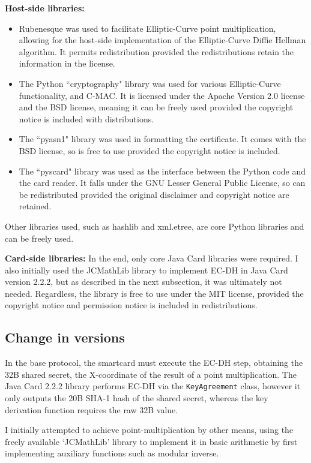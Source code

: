 \documentclass[12pt,a4paper]{article}
\begin{document}
\textbf{Host-side libraries:}
\begin{itemize}
	\item Rubenesque was used to facilitate Elliptic-Curve point multiplication, allowing for the host-side implementation of the Elliptic-Curve Diffie Hellman algorithm. It permits redistribution provided the redistributions retain the information in the license.
	
	\item The Python ``cryptography" library was used for various Elliptic-Curve functionality, and C-MAC. It is licensed under the Apache Version 2.0 license and the BSD license, meaning it can be freely used provided the copyright notice is included with distributions.
	
	\item The ``pyasn1" library was used in formatting the certificate. It comes with the BSD license, so is free to use provided the copyright notice is included.
	
	\item The ``pyscard" library was used as the interface between the Python code and the card reader. It falls under the GNU Lesser General Public License, so can be redistributed provided the original disclaimer and copyright notice are retained.
\end{itemize}
Other libraries used, such as hashlib and xml.etree, are core Python libraries and can be freely used.

\textbf{Card-side libraries:} In the end, only core Java Card libraries were required. I also initially used the JCMathLib library to implement EC-DH in Java Card version 2.2.2, but as described in the next subsection, it was ultimately not needed. Regardless, the library is free to use under the MIT license, provided the copyright notice and permission notice is included in redistributions.


\subsection{Change in versions}
\label{subsec:version_change}
In the base protocol, the smartcard must execute the EC-DH step, obtaining the 32B shared secret, the X-coordinate of the result of a point multiplication. The Java Card 2.2.2 library performs EC-DH via the \verb|KeyAgreement| class, however it only outputs the 20B SHA-1 hash of the shared secret, whereas the key derivation function requires the raw 32B value.

I initially attempted to achieve point-multiplication by other means, using the freely available `JCMathLib' library to implement it in basic arithmetic by first implementing auxiliary functions such as modular inverse.
\end{document}

